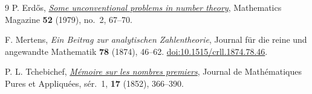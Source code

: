 \documentclass[11pt,reqno]{amsart}
\theoremstyle{remark}
\numberwithin{equation}{section}
\begin{document}
\begin{thebibliography}{9}
P. Erd\H{o}s, \href{https://users.renyi.hu/~p_erdos/1979-22.pdf}{\emph{Some unconventional problems in number theory}},
Mathematics Magazine \textbf{52} (1979), no.~2, 67--70.

F. Mertens, \emph{Ein Beitrag zur analytischen Zahlentheorie},
Journal f\"ur die reine und angewandte Mathematik \textbf{78} (1874), 46--62.
\href{https://doi.org/10.1515/crll.1874.78.46}{doi:10.1515/crll.1874.78.46}.

P. L. Tchebichef, \href{https://www.numdam.org/item/JMPA_1852_1_17__366_0/}{\emph{M\'emoire sur les nombres premiers}},
Journal de Math\'ematiques Pures et Appliqu\'ees, s\'er.~1,
\textbf{17} (1852), 366--390.
\end{thebibliography}
\end{document}
